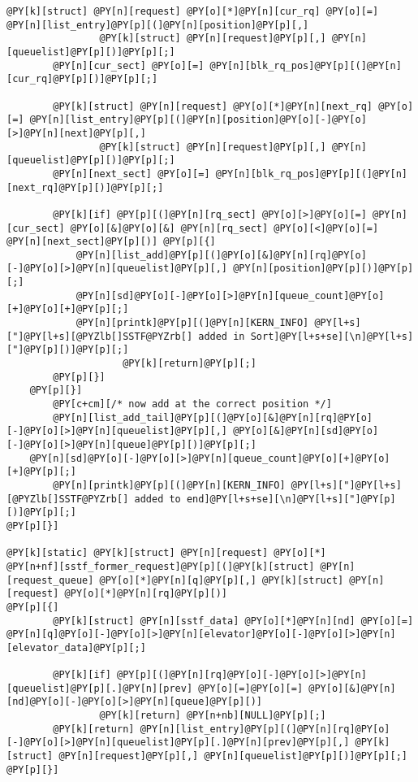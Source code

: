 \begin{Verbatim}[commandchars=@\[\]]
		@PY[k][struct] @PY[n][request] @PY[o][*]@PY[n][cur_rq] @PY[o][=] @PY[n][list_entry]@PY[p][(]@PY[n][position]@PY[p][,] 
				@PY[k][struct] @PY[n][request]@PY[p][,] @PY[n][queuelist]@PY[p][)]@PY[p][;]
		@PY[n][cur_sect] @PY[o][=] @PY[n][blk_rq_pos]@PY[p][(]@PY[n][cur_rq]@PY[p][)]@PY[p][;]
		
		@PY[k][struct] @PY[n][request] @PY[o][*]@PY[n][next_rq] @PY[o][=] @PY[n][list_entry]@PY[p][(]@PY[n][position]@PY[o][-]@PY[o][>]@PY[n][next]@PY[p][,] 
				@PY[k][struct] @PY[n][request]@PY[p][,] @PY[n][queuelist]@PY[p][)]@PY[p][;]
		@PY[n][next_sect] @PY[o][=] @PY[n][blk_rq_pos]@PY[p][(]@PY[n][next_rq]@PY[p][)]@PY[p][;]

		@PY[k][if] @PY[p][(]@PY[n][rq_sect] @PY[o][>]@PY[o][=] @PY[n][cur_sect] @PY[o][&]@PY[o][&] @PY[n][rq_sect] @PY[o][<]@PY[o][=] @PY[n][next_sect]@PY[p][)] @PY[p][{]
			@PY[n][list_add]@PY[p][(]@PY[o][&]@PY[n][rq]@PY[o][-]@PY[o][>]@PY[n][queuelist]@PY[p][,] @PY[n][position]@PY[p][)]@PY[p][;]
			@PY[n][sd]@PY[o][-]@PY[o][>]@PY[n][queue_count]@PY[o][+]@PY[o][+]@PY[p][;]
			@PY[n][printk]@PY[p][(]@PY[n][KERN_INFO] @PY[l+s]["]@PY[l+s][@PYZlb[]SSTF@PYZrb[] added in Sort]@PY[l+s+se][\n]@PY[l+s]["]@PY[p][)]@PY[p][;]
	                @PY[k][return]@PY[p][;]
		@PY[p][}]
	@PY[p][}]
        @PY[c+cm][/* now add at the correct position */]
        @PY[n][list_add_tail]@PY[p][(]@PY[o][&]@PY[n][rq]@PY[o][-]@PY[o][>]@PY[n][queuelist]@PY[p][,] @PY[o][&]@PY[n][sd]@PY[o][-]@PY[o][>]@PY[n][queue]@PY[p][)]@PY[p][;]
	@PY[n][sd]@PY[o][-]@PY[o][>]@PY[n][queue_count]@PY[o][+]@PY[o][+]@PY[p][;]
        @PY[n][printk]@PY[p][(]@PY[n][KERN_INFO] @PY[l+s]["]@PY[l+s][@PYZlb[]SSTF@PYZrb[] added to end]@PY[l+s+se][\n]@PY[l+s]["]@PY[p][)]@PY[p][;]
@PY[p][}]

@PY[k][static] @PY[k][struct] @PY[n][request] @PY[o][*]
@PY[n+nf][sstf_former_request]@PY[p][(]@PY[k][struct] @PY[n][request_queue] @PY[o][*]@PY[n][q]@PY[p][,] @PY[k][struct] @PY[n][request] @PY[o][*]@PY[n][rq]@PY[p][)]
@PY[p][{]
        @PY[k][struct] @PY[n][sstf_data] @PY[o][*]@PY[n][nd] @PY[o][=] @PY[n][q]@PY[o][-]@PY[o][>]@PY[n][elevator]@PY[o][-]@PY[o][>]@PY[n][elevator_data]@PY[p][;]

        @PY[k][if] @PY[p][(]@PY[n][rq]@PY[o][-]@PY[o][>]@PY[n][queuelist]@PY[p][.]@PY[n][prev] @PY[o][=]@PY[o][=] @PY[o][&]@PY[n][nd]@PY[o][-]@PY[o][>]@PY[n][queue]@PY[p][)]
                @PY[k][return] @PY[n+nb][NULL]@PY[p][;]
        @PY[k][return] @PY[n][list_entry]@PY[p][(]@PY[n][rq]@PY[o][-]@PY[o][>]@PY[n][queuelist]@PY[p][.]@PY[n][prev]@PY[p][,] @PY[k][struct] @PY[n][request]@PY[p][,] @PY[n][queuelist]@PY[p][)]@PY[p][;]
@PY[p][}]


\end{Verbatim}

